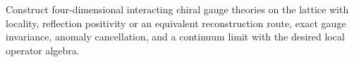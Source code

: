 \begin{openproblem}
\label{op:chiral-gauge-lattice}
Construct four-dimensional interacting chiral gauge theories on the lattice
with locality, reflection positivity or an equivalent reconstruction route,
exact gauge invariance, anomaly cancellation, and a continuum limit with the
desired local operator algebra.
\end{openproblem}
